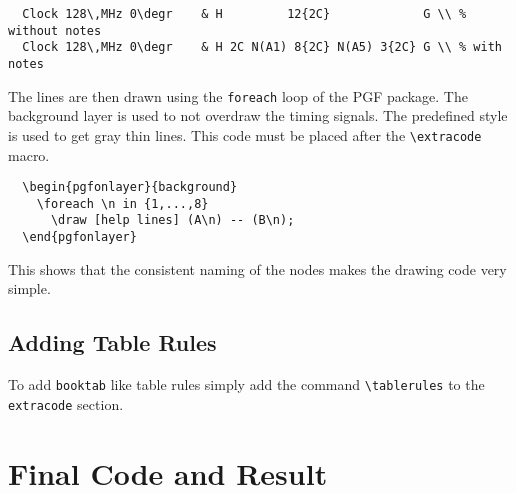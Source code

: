\documentclass{article}
\def\degr{${}^\circ$}
\begin{document}
\begin{verbatim}
  Clock 128\,MHz 0\degr    & H         12{2C}             G \\ % without notes
  Clock 128\,MHz 0\degr    & H 2C N(A1) 8{2C} N(A5) 3{2C} G \\ % with    notes
\end{verbatim}

The lines are then drawn using the \texttt{foreach} loop of the PGF package.
The background layer is used to not overdraw the timing signals. The predefined 
style  is used to get gray thin lines.
This code must be placed after the \verb+\extracode+ macro.

\begin{verbatim}
  \begin{pgfonlayer}{background}
    \foreach \n in {1,...,8}
      \draw [help lines] (A\n) -- (B\n);
  \end{pgfonlayer}
\end{verbatim}

This shows that the consistent naming of the nodes makes the drawing code very 
simple.

\subsection{Adding Table Rules}
To add \texttt{booktab} like table rules simply add the command 
\verb+\tablerules+ to the \texttt{extracode} section.

\section{Final Code and Result}
\end{document}
